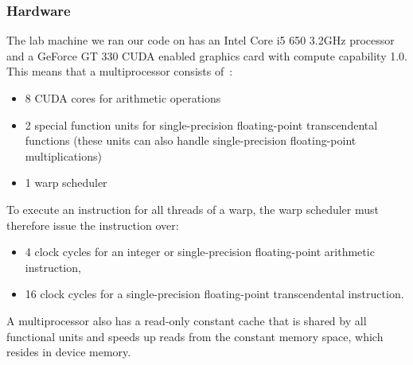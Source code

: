 \subsubsection{Hardware}
  The lab machine we ran our code on has an Intel Core i5 650 3.2GHz processor and a GeForce GT 330 CUDA enabled graphics card with compute capability 1.0. This means that a multiprocessor consists of~\cite{compute_1.0}:
  \begin{itemize}
    \item 8 CUDA cores for arithmetic operations
    \item 2 special function units for single-precision floating-point transcendental functions (these units can also handle single-precision floating-point multiplications)
    \item 1 warp scheduler
  \end{itemize}
  To execute an instruction for all threads of a warp, the warp scheduler must therefore issue the instruction over:
  \begin{itemize}
    \item 4 clock cycles for an integer or single-precision floating-point arithmetic instruction,
    \item 16 clock cycles for a single-precision floating-point transcendental instruction.
  \end{itemize}
  A multiprocessor also has a read-only constant cache that is shared by all functional units and speeds up reads from the constant memory space, which resides in device memory.